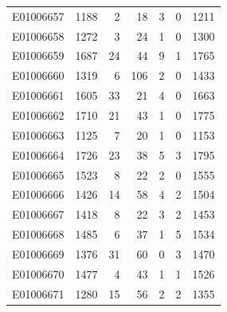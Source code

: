 \documentclass[
  letterpaper,
  DIV=11,
  numbers=noendperiod]{scrreprt}
\begin{document}
\begin{tabular}{lrrrrrr}
E01006657     &    1188 &       2 &                    18 &                               3 &                       0 &              1211 \\
E01006658     &    1272 &       3 &                    24 &                               1 &                       0 &              1300 \\
E01006659     &    1687 &      24 &                    44 &                               9 &                       1 &              1765 \\
E01006660     &    1319 &       6 &                   106 &                               2 &                       0 &              1433 \\
E01006661     &    1605 &      33 &                    21 &                               4 &                       0 &              1663 \\
E01006662     &    1710 &      21 &                    43 &                               1 &                       0 &              1775 \\
E01006663     &    1125 &       7 &                    20 &                               1 &                       0 &              1153 \\
E01006664     &    1726 &      23 &                    38 &                               5 &                       3 &              1795 \\
E01006665     &    1523 &       8 &                    22 &                               2 &                       0 &              1555 \\
E01006666     &    1426 &      14 &                    58 &                               4 &                       2 &              1504 \\
E01006667     &    1418 &       8 &                    22 &                               3 &                       2 &              1453 \\
E01006668     &    1485 &       6 &                    37 &                               1 &                       5 &              1534 \\
E01006669     &    1376 &      31 &                    60 &                               0 &                       3 &              1470 \\
E01006670     &    1477 &       4 &                    43 &                               1 &                       1 &              1526 \\
E01006671     &    1280 &      15 &                    56 &                               2 &                       2 &              1355 \\

\end{tabular}
\end{document}
